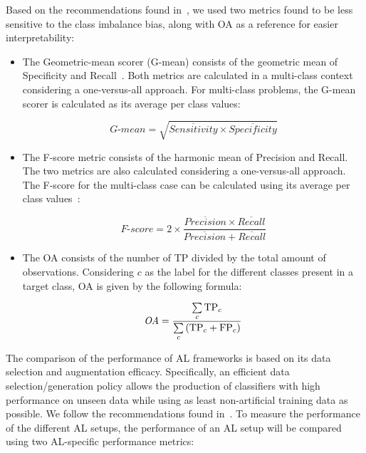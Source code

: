 \documentclass[parskip=full]{scrartcl}
\begin{document}
Based on the recommendations found in~\cite{Jeni2013, Kubat1997}, we used two
metrics found to be less sensitive to the class imbalance bias, along with OA
as a reference for easier interpretability:

\begin{itemize}
    \item The Geometric-mean scorer (G-mean) consists of the geometric mean of
        Specificity and Recall~\cite{Kubat1997}. Both metrics are calculated
        in a multi-class context considering a one-versus-all approach. For
        multi-class problems, the G-mean scorer is calculated as its average
        per class values: 
        
        \begin{equation*}
            \textit{G-mean} = \sqrt{\overline{Sensitivity} \times
            \overline{Specificity}}
        \end{equation*}

    \item The F-score metric consists of the harmonic mean of Precision and
        Recall. The two metrics are also calculated considering a
        one-versus-all approach. The F-score for the multi-class case can be
        calculated using its average per class values~\cite{Jeni2013}:

        \begin{equation*}
            \textit{F-score}=2\times\frac{\overline{Precision} \times
            \overline{Recall}}{\overline{Precision} + \overline{Recall}}
        \end{equation*}

    \item The OA consists of the number of TP divided by the total amount of
        observations. Considering $c$ as the label for the different classes
        present in a target class, OA is given by the following formula:

        \begin{equation*}
            \textit{OA} = \frac{\sum\limits_{c}{\text{TP}_{c}}}{%
		    	      \sum\limits_{c}{(\text{TP}_{c}+\text{FP}_{c})}}
        \end{equation*}
\end{itemize}

The comparison of the performance of AL frameworks is based on its data
selection and augmentation efficacy. Specifically, an efficient data
selection/generation policy allows the production of classifiers with high
performance on unseen data while using as least non-artificial training data
as possible. We follow the recommendations found in~\cite{Kottke2017}. To
measure the performance of the different AL setups, the performance of an AL
setup will be compared using two AL-specific performance metrics:
\end{document}
